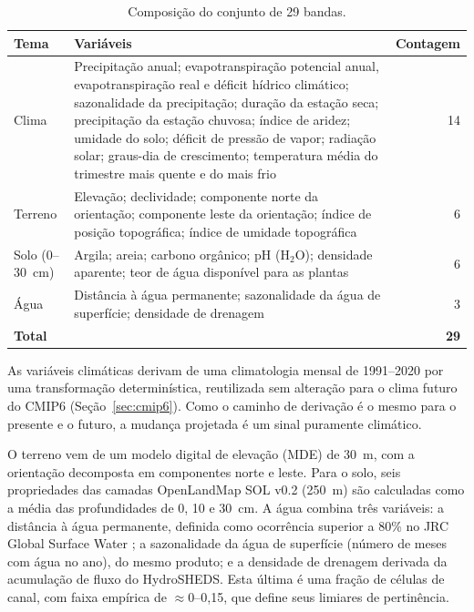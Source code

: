 \begin{table}[htbp]
\centering
\caption{Composição do conjunto de 29 bandas.}\label{tab:stack}
\begin{tabular}{@{}l>{\raggedright\arraybackslash}p{10cm}r@{}}
\toprule
Tema & Variáveis & Contagem \\
\midrule
Clima & Precipitação anual; evapotranspiração potencial anual, evapotranspiração real e déficit
  hídrico climático; sazonalidade da precipitação; duração da estação seca; precipitação da estação
  chuvosa; índice de aridez; umidade do solo; déficit de pressão de vapor; radiação solar; graus-dia
  de crescimento; temperatura média do trimestre mais quente e do mais frio & 14 \\
Terreno & Elevação; declividade; componente norte da orientação; componente leste da orientação; índice
  de posição topográfica; índice de umidade topográfica & 6 \\
Solo (0--30~cm) & Argila; areia; carbono orgânico; pH (H$_2$O); densidade aparente;
  teor de água disponível para as plantas & 6 \\
Água & Distância à água permanente; sazonalidade da água de superfície; densidade de drenagem & 3 \\
\midrule
\textbf{Total} & & \textbf{29} \\
\bottomrule
\end{tabular}
\end{table}

As variáveis climáticas derivam de uma climatologia mensal de 1991--2020 por uma transformação
determinística, reutilizada sem alteração para o clima futuro do CMIP6 (Seção~\ref{sec:cmip6}).
Como o caminho de derivação é o mesmo para o presente e o futuro, a mudança projetada é um sinal
puramente climático.

O terreno vem de um modelo digital de elevação (MDE) de 30~m, com a orientação decomposta em
componentes norte e leste. Para o solo, seis propriedades das camadas OpenLandMap SOL v0.2 (250~m) são
calculadas como a média das profundidades de 0, 10 e 30~cm. A água combina três variáveis: a distância
à água permanente, definida como ocorrência superior a 80\% no JRC Global Surface Water
\citep{pekel_high-resolution_2016}; a sazonalidade da água de superfície (número de meses com água no
ano), do mesmo produto; e a densidade de drenagem derivada da acumulação de fluxo do HydroSHEDS. Esta
última é uma fração de células de canal, com faixa empírica de $\approx$0--0,15, que define seus
limiares de pertinência.

